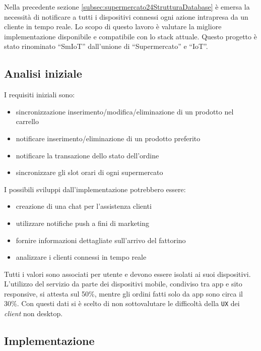 Nella precedente sezione \ref{subsec:supermercato24StrutturaDatabase} è emersa la necessità di notificare a tutti i dispositivi connessi ogni azione intrapresa da un cliente in tempo reale.
Lo scopo di questo lavoro è valutare la migliore implementazione disponibile e compatibile con lo stack attuale.
Questo progetto è stato rinominato ``SmIoT'' dall'unione di ``Supermercato'' e ``IoT''.

\subsection{Analisi iniziale}
\label{subsec:smiotAnalisi}

\noindent
I requisiti iniziali sono:
\begin{itemize}
  \item sincronizzazione inserimento/modifica/eliminazione di un prodotto nel carrello
  \item notificare inserimento/eliminazione di un prodotto preferito
  \item notificare la transazione dello stato dell'ordine
  \item sincronizzare gli slot orari di ogni supermercato
\end{itemize}

\bigskip
\noindent
I possibili sviluppi dall'implementazione potrebbero essere:
\begin{itemize}
  \item creazione di una chat per l'assistenza clienti
  \item utilizzare notifiche push a fini di marketing
  \item fornire informazioni dettagliate sull'arrivo del fattorino
  \item analizzare i clienti connessi in tempo reale
\end{itemize}

Tutti i valori sono associati per utente e devono essere isolati ai suoi dispositivi.
L'utilizzo del servizio da parte dei dispositivi mobile, condiviso tra app e sito responsive, si attesta sul 50\%, mentre gli ordini fatti solo da app sono circa il 30\%.
Con questi dati si è scelto di non sottovalutare le difficoltà della \verb+UX+ dei \textit{client} non desktop.

\subsection{Implementazione}
\label{subsec:smiotImplementazione}

